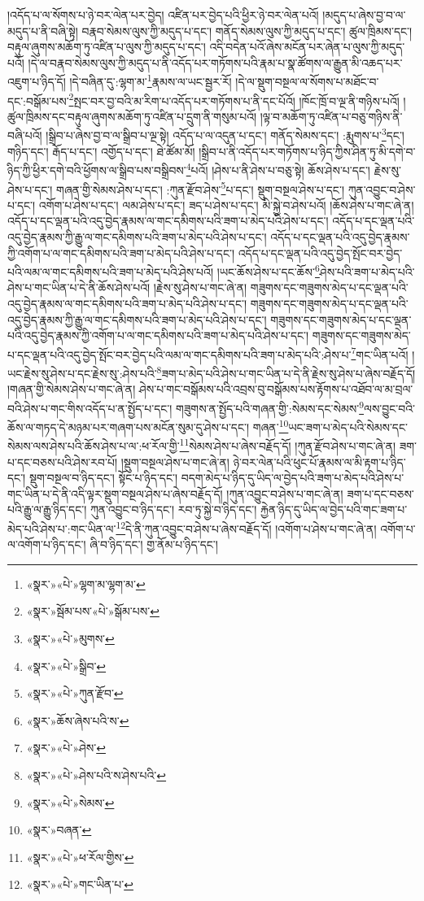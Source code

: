 །འདོད་པ་ལ་སོགས་པ་ཉེ་བར་ལེན་པར་བྱེད། འཛིན་པར་བྱེད་པའི་ཕྱིར་ཉེ་བར་ལེན་པའོ། །མདུད་པ་ཞེས་བྱ་བ་ལ་མདུད་པ་ནི་བཞི་སྟེ། བརྣབ་སེམས་ལུས་ཀྱི་མདུད་པ་དང་། གནོད་སེམས་ལུས་ཀྱི་མདུད་པ་དང་། ཚུལ་ཁྲིམས་དང་། བརྟུལ་ཞུགས་མཆོག་ཏུ་འཛིན་པ་ལུས་ཀྱི་མདུད་པ་དང་། འདི་བདེན་པའོ་ཞེས་མངོན་པར་ཞེན་པ་ལུས་ཀྱི་མདུད་པའོ། །དེ་ལ་བརྣབ་སེམས་ལུས་ཀྱི་མདུད་པ་ནི་འདོད་པར་གཏོགས་པའི་རྣམ་པ་སྣ་ཚོགས་ལ་རྒྱུན་མི་འཆད་པར་འཇུག་པ་ཉིད་དོ། །དེ་བཞིན་དུ་:ལྷག་མ་\footnote{«སྣར་»«པེ་»ལྷག་མ་ལྷག་མ་}རྣམས་ལ་ཡང་སྦྱར་རོ། །དེ་ལ་སྡུག་བསྔལ་ལ་སོགས་པ་མཐོང་བ་དང་:བསྒོམ་པས་\footnote{«སྣར་»སྦོམ་པས་«པེ་»སྒོམ་པས་}སྤང་བར་བྱ་བའི་མ་རིག་པ་འདོད་པར་གཏོགས་པ་ནི་དང་པོའོ། །ཁོང་ཁྲོ་བ་ལྔ་ནི་གཉིས་པའོ། །ཚུལ་ཁྲིམས་དང་བརྟུལ་ཞུགས་མཆོག་ཏུ་འཛིན་པ་དྲུག་ནི་གསུམ་པའོ། །ལྟ་བ་མཆོག་ཏུ་འཛིན་པ་བཅུ་གཉིས་ནི་བཞི་པའོ། །སྒྲིབ་པ་ཞེས་བྱ་བ་ལ་སྒྲིབ་པ་ལྔ་སྟེ། འདོད་པ་ལ་འདུན་པ་དང་། གནོད་སེམས་དང་། :རྨུགས་པ་\footnote{«སྣར་»«པེ་»མུགས་}དང་། གཉིད་དང་། རྒོད་པ་དང་། འགྱོད་པ་དང་། ཐེ་ཚོམ་མོ། །སྒྲིབ་པ་ནི་འདོད་པར་གཏོགས་པ་ཉིད་ཀྱིས་ཤིན་ཏུ་མི་དགེ་བ་ཉིད་ཀྱི་ཕྱིར་དགེ་བའི་ཕྱོགས་ལ་སྒྲིབ་པས་བསྒྲིབས་\footnote{«སྣར་»«པེ་»སྒྲིབ་}པའོ། །ཤེས་པ་ནི་ཤེས་པ་བཅུ་སྟེ། ཆོས་ཤེས་པ་དང་། རྗེས་སུ་ཤེས་པ་དང་། གཞན་གྱི་སེམས་ཤེས་པ་དང་། :ཀུན་རྫོབ་ཤེས་\footnote{«སྣར་»«པེ་»ཀུན་རྫོབ་}པ་དང་། སྡུག་བསྔལ་ཤེས་པ་དང་། ཀུན་འབྱུང་བ་ཤེས་པ་དང་། འགོག་པ་ཤེས་པ་དང་། ལམ་ཤེས་པ་དང་། ཟད་པ་ཤེས་པ་དང་། མི་སྐྱེ་བ་ཤེས་པའོ། །ཆོས་ཤེས་པ་གང་ཞེ་ན། འདོད་པ་དང་ལྡན་པའི་འདུ་བྱེད་རྣམས་ལ་གང་དམིགས་པའི་ཟག་པ་མེད་པའི་ཤེས་པ་དང་། འདོད་པ་དང་ལྡན་པའི་འདུ་བྱེད་རྣམས་ཀྱི་རྒྱུ་ལ་གང་དམིགས་པའི་ཟག་པ་མེད་པའི་ཤེས་པ་དང་། འདོད་པ་དང་ལྡན་པའི་འདུ་བྱེད་རྣམས་ཀྱི་འགོག་པ་ལ་གང་དམིགས་པའི་ཟག་པ་མེད་པའི་ཤེས་པ་དང་། འདོད་པ་དང་ལྡན་པའི་འདུ་བྱེད་སྤོང་བར་བྱེད་པའི་ལམ་ལ་གང་དམིགས་པའི་ཟག་པ་མེད་པའི་ཤེས་པའོ། །ཡང་ཆོས་ཤེས་པ་དང་ཆོས་\footnote{«སྣར་»ཆོས་ཞེས་པའི་ས་}ཤེས་པའི་ཟག་པ་མེད་པའི་ཤེས་པ་གང་ཡིན་པ་དེ་ནི་ཆོས་ཤེས་པའོ། །རྗེས་སུ་ཤེས་པ་གང་ཞེ་ན། གཟུགས་དང་གཟུགས་མེད་པ་དང་ལྡན་པའི་འདུ་བྱེད་རྣམས་ལ་གང་དམིགས་པའི་ཟག་པ་མེད་པའི་ཤེས་པ་དང་། གཟུགས་དང་གཟུགས་མེད་པ་དང་ལྡན་པའི་འདུ་བྱེད་རྣམས་ཀྱི་རྒྱུ་ལ་གང་དམིགས་པའི་ཟག་པ་མེད་པའི་ཤེས་པ་དང་། གཟུགས་དང་གཟུགས་མེད་པ་དང་ལྡན་པའི་འདུ་བྱེད་རྣམས་ཀྱི་འགོག་པ་ལ་གང་དམིགས་པའི་ཟག་པ་མེད་པའི་ཤེས་པ་དང་། གཟུགས་དང་གཟུགས་མེད་པ་དང་ལྡན་པའི་འདུ་བྱེད་སྤོང་བར་བྱེད་པའི་ལམ་ལ་གང་དམིགས་པའི་ཟག་པ་མེད་པའི་:ཤེས་པ་\footnote{«སྣར་»«པེ་»ཤེས་}གང་ཡིན་པའོ། །ཡང་རྗེས་སུ་ཤེས་པ་དང་རྗེས་སུ་:ཤེས་པའི་\footnote{«སྣར་»«པེ་»ཤེས་པའི་ས་ཤེས་པའི་}ཟག་པ་མེད་པའི་ཤེས་པ་གང་ཡིན་པ་དེ་ནི་རྗེས་སུ་ཤེས་པ་ཞེས་བརྗོད་དོ། །གཞན་གྱི་སེམས་ཤེས་པ་གང་ཞེ་ན། ཤེས་པ་གང་བསྒོམས་པའི་འབྲས་བུ་བསྒོམས་པས་རྟོགས་པ་འཐོབ་ལ་མ་བྲལ་བའི་ཤེས་པ་གང་གིས་འདོད་པ་ན་སྤྱོད་པ་དང་། གཟུགས་ན་སྤྱོད་པའི་གཞན་གྱི་:སེམས་དང་སེམས་\footnote{«སྣར་»«པེ་»སེམས་}ལས་བྱུང་བའི་ཆོས་ལ་གཏད་དེ་མཉམ་པར་གཞག་པས་མངོན་སུམ་དུ་ཤེས་པ་དང་། གཞན་\footnote{«སྣར་»བཞན་}ཡང་ཟག་པ་མེད་པའི་སེམས་དང་སེམས་ལས་ཤེས་པའི་ཆོས་ཤེས་པ་ལ་:ཕ་རོལ་གྱི་\footnote{«སྣར་»«པེ་»ཕ་རོལ་གྱིས་}སེམས་ཤེས་པ་ཞེས་བརྗོད་དོ། །ཀུན་རྫོབ་ཤེས་པ་གང་ཞེ་ན། ཟག་པ་དང་བཅས་པའི་ཤེས་རབ་པོ། །སྡུག་བསྔལ་ཤེས་པ་གང་ཞེ་ན། ཉེ་བར་ལེན་པའི་ཕུང་པོ་རྣམས་ལ་མི་རྟག་པ་ཉིད་དང་། སྡུག་བསྔལ་བ་ཉིད་དང་། སྟོང་པ་ཉིད་དང་། བདག་མེད་པ་ཉིད་དུ་ཡིད་ལ་བྱེད་པའི་ཟག་པ་མེད་པའི་ཤེས་པ་གང་ཡིན་པ་དེ་ནི་འདི་ལྟར་སྡུག་བསྔལ་ཤེས་པ་ཞེས་བརྗོད་དོ། །ཀུན་འབྱུང་བ་ཤེས་པ་གང་ཞེ་ན། ཟག་པ་དང་བཅས་པའི་རྒྱུ་ལ་རྒྱུ་ཉིད་དང་། ཀུན་འབྱུང་བ་ཉིད་དང་། རབ་ཏུ་སྐྱེ་བ་ཉིད་དང་། རྐྱེན་ཉིད་དུ་ཡིད་ལ་བྱེད་པའི་གང་ཟག་པ་མེད་པའི་ཤེས་པ་:གང་ཡིན་ལ་\footnote{«སྣར་»«པེ་»གང་ཡིན་པ་}དེ་ནི་ཀུན་འབྱུང་བ་ཤེས་པ་ཞེས་བརྗོད་དོ། །འགོག་པ་ཤེས་པ་གང་ཞེ་ན། འགོག་པ་ལ་འགོག་པ་ཉིད་དང་། ཞི་བ་ཉིད་དང་། གྱ་ནོམ་པ་ཉིད་དང་། 